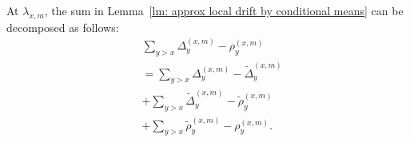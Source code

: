 \documentclass[EJP]{ejpecp} %
\begin{document}
At $\lambda_{x, m}$, the sum in Lemma~\ref{lm: approx local drift by conditional means} can be decomposed as follows:
\begin{align}
	\label{eq:tempered-difference-0}
	&\sum_{y > x} \Delta_y^{(x,m)} -  \rho_y^{(x,m)}  \\
	\label{eq:tempered-difference-1}
	&= \sum_{y > x} \Delta_y^{(x,m)} - \tilde\Delta_y^{(x,m)} \\
	\label{eq:tempered-difference-2}
	&+ \sum_{y > x} \tilde \Delta_{y}^{(x,m)} - \tilde\rho_y^{(x,m)} \\
	\label{eq:tempered-difference-3}
	&+ \sum_{y > x} \tilde\rho_y^{(x,m)} - \rho_y^{(x,m)} 
	.\end{align}
\end{document}
